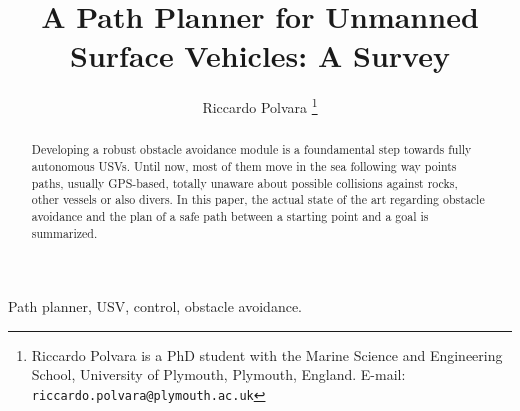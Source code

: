 \documentclass[journal]{IEEEtran}
\begin{document}
%
\title{A Path Planner for Unmanned Surface Vehicles: A Survey}
%
%
%

\author{Riccardo Polvara%
\thanks{Riccardo Polvara is a PhD student with the Marine Science and Engineering School, University of Plymouth, Plymouth, England.
      E-mail: {\tt riccardo.polvara@plymouth.ac.uk}}}




\maketitle


\begin{abstract}
Developing a robust obstacle avoidance module is a foundamental step towards fully autonomous USVs. Until now, most of them move in the sea following way points paths,
 usually GPS-based, totally unaware about possible collisions against rocks, other vessels or also divers. In this paper, the actual state of the art regarding obstacle avoidance
 and the plan of a safe path between a starting point and a goal is summarized.
\end{abstract}


\begin{IEEEkeywords}
Path planner, USV, control, obstacle avoidance.
\end{IEEEkeywords}



%
\end{document}
